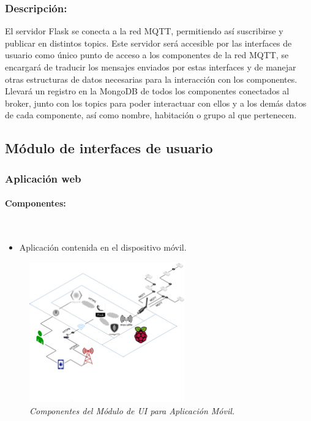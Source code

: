 \subsubsection{Descripción:}

El servidor Flask se conecta a la red MQTT, permitiendo así suscribirse y publicar en distintos topics. Este servidor será accesible por las interfaces de usuario como único punto de acceso a los componentes de la red MQTT, se encargará de traducir los mensajes enviados por estas interfaces y de manejar otras estructuras de datos necesarias para la interacción con los componentes. Llevará un registro en la MongoDB de todos los componentes conectados al broker, junto con los topics para poder interactuar con ellos y a los demás datos de cada componente, así como nombre, habitación o grupo al que pertenecen.

\subsection{Módulo de interfaces de usuario}

\subsubsection{Aplicación web}

\paragraph{Componentes:} ~

\begin{itemize}

\item Aplicación contenida en el dispositivo móvil.

\end{itemize}

\begin{figure}[h]
  \centering
  \includegraphics[width=0.6\textwidth, keepaspectratio]{images/mod-ui-webapp}
  \caption{\textit{Componentes del Módulo de UI para Aplicación Móvil.}}
  \label{fig:mod-ui-webapp}
\end{figure}

